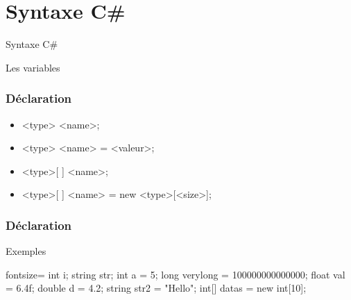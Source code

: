 \section{Syntaxe C\#}

\begingroup
{}
\begin{frame}
    \begin{center}
        \vspace{1cm}
        {\Large\color{background}
            Syntaxe C\#
        }
    \end{center}
\end{frame}
\endgroup

\begin{frame}
  \begin{center}
    \vspace{1cm}
    Les variables
  \end{center}
\end{frame}

\begin{frame}[c]
  \frametitle{Déclaration}

  \begin{center}
    \begin{itemize}
      \item<+-> <type> <name>;
      \item<+-> <type> <name> = <valeur>;
      \item<+-> <type>[ ] <name>;
      \item<+-> <type>[ ] <name> = new <type>[<size>];
    \end{itemize}
  \end{center}
\end{frame}

\begin{frame}[fragile]
  \frametitle{Déclaration}

  \begin{center}{\large Exemples}\end{center}
  \begin{csharpcode*}{fontsize=\scriptsize}
    int i;
    string str;
    int a = 5;
    long verylong = 100000000000000;
    float val = 6.4f;
    double d = 4.2;
    string str2 = "Hello";
    int[] datas = new int[10];
  \end{csharpcode*}
\end{frame}

